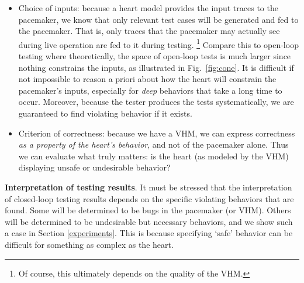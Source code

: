 \begin{itemize}
	\item Choice of inputs: because a heart model provides the input traces to the pacemaker, we know that only relevant test cases will be generated and fed to the pacemaker. 
	That is, only traces that the pacemaker may actually see during live operation are fed to it during testing. 
	\footnote{Of course, this ultimately depends on the quality of the VHM.}
	Compare this to open-loop testing where theoretically, the space of open-loop tests is much larger since nothing constrains the inputs, as illustrated in Fig.~\ref{fig:cone}.
	It is difficult if not impossible to reason a priori about how the heart will constrain the pacemaker's inputs, especially for \emph{deep} behaviors that take a long time to occur.	
	Moreover, because the tester produces the tests systematically, we are guaranteed to find violating behavior if it exists.
	\item Criterion of correctness: because we have a VHM, we can express correctness \emph{as a property of the heart's behavior}, and not of the pacemaker alone. 
	Thus we can evaluate what truly matters: is the heart (as modeled by the VHM) displaying unsafe or undesirable behavior?
\end{itemize}


\textbf{Interpretation of testing results}.
It must be stressed that the interpretation of closed-loop testing results depends on the specific violating behaviors that are found.
Some will be determined to be bugs in the pacemaker (or VHM). 
Others will be determined to be undesirable but necessary behaviors, and we show such a case in Section \ref{experiments}.
This is because specifying `safe' behavior can be difficult for something as complex as the heart.
